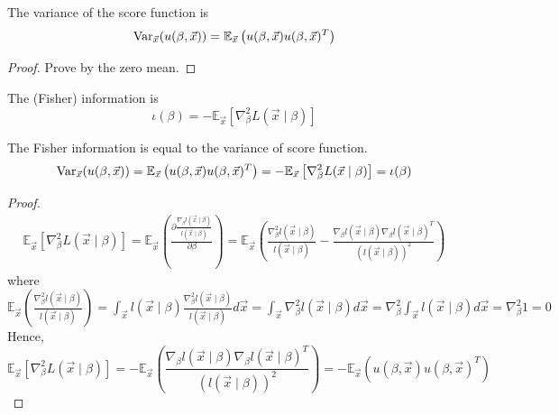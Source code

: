 \documentclass[11pt]{elegantbook}
\begin{document}
\begin{lemma}
    The variance of the score function is $$\textnormal{Var}_{\vec{x}}(u(\beta, \vec{x}))= \mathbb{E}_{\vec{x}}\left(u(\beta, \vec{x})u(\beta, \vec{x})^T\right)$$
\end{lemma}
\begin{proof}
    Prove by the zero mean.
\end{proof}

\begin{definition}
    \normalfont
    The (Fisher) information is $$\iota(\beta)=-\mathbb{E}_{\vec{x}}\left[\nabla^2_\beta L(\vec{x}\mid\beta)\right]$$
\end{definition}
\begin{lemma}
    The Fisher information is equal to the variance of score function.
    $$\textnormal{Var}_{\vec{x}}(u(\beta, \vec{x}))=\mathbb{E}_{\vec{x}}\left(u(\beta,\vec{x})u(\beta,\vec{x})^T\right)=-\mathbb{E}_{\vec{x}}\left[\nabla^2_\beta L(\vec{x}\mid\beta)\right]=\iota(\beta)$$
\end{lemma}
\begin{proof}
    \begin{equation}
        \begin{aligned}
            \mathbb{E}_{\vec{x}}\left[\nabla^2_\beta L(\vec{x}\mid\beta)\right]=\mathbb{E}_{\vec{x}}\left(\frac{\partial \frac{\nabla_{\beta} l(\vec{x}\mid \beta)}{l(\vec{x}\mid \beta)}}{\partial \beta}\right)=\mathbb{E}_{\vec{x}}\left(\frac{\nabla^2_{\beta} l(\vec{x}\mid \beta)}{l(\vec{x}\mid \beta)}-\frac{\nabla_{\beta} l(\vec{x}\mid \beta)\nabla_{\beta} l(\vec{x}\mid \beta)^T}{(l(\vec{x}\mid \beta))^2} \right)
        \end{aligned}
        \nonumber
    \end{equation}
    where $\mathbb{E}_{\vec{x}}\left(\frac{\nabla^2_{\beta} l(\vec{x}\mid \beta)}{l(\vec{x}\mid \beta)}\right)=\int_{\vec{x}}l(\vec{x}\mid \beta)\frac{\nabla^2_{\beta} l(\vec{x}\mid \beta)}{l(\vec{x}\mid \beta)}d \vec{x}=\int_{\vec{x}}\nabla^2_{\beta} l(\vec{x}\mid \beta)d \vec{x}=\nabla^2_{\beta}\int_{\vec{x}} l(\vec{x}\mid \beta)d \vec{x}=\nabla^2_{\beta} 1=0$
    Hence, $$\mathbb{E}_{\vec{x}}\left[\nabla^2_\beta L(\vec{x}\mid\beta)\right]=-\mathbb{E}_{\vec{x}}\left(\frac{\nabla_{\beta} l(\vec{x}\mid \beta)\nabla_{\beta} l(\vec{x}\mid \beta)^T}{(l(\vec{x}\mid \beta))^2} \right)=-\mathbb{E}_{\vec{x}}\left(u(\beta,\vec{x})u(\beta,\vec{x})^T\right)$$
\end{proof}
\end{document}

